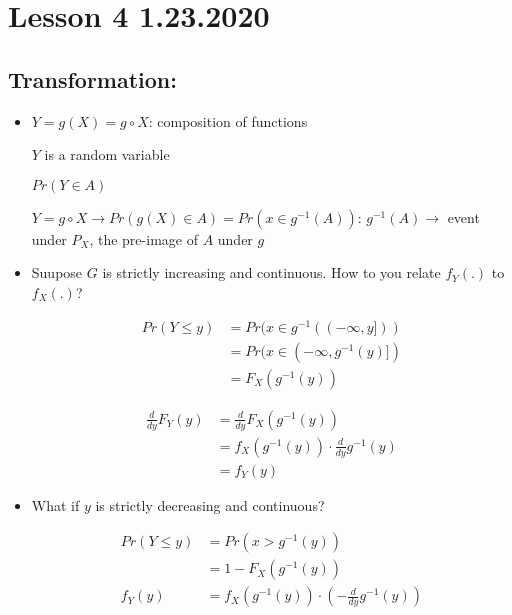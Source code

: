 \documentclass[11pt,letterpaper,titlepage]{article}
\begin{document}
\newpage

\section{Lesson 4 1.23.2020}

\subsection{Transformation:}

\begin{itemize}

    \item $Y = g(X) = g \circ X$: composition of functions
    
    $Y$ is a random variable
    
    $Pr(Y \in A)$
    
    $Y = g \circ X \rightarrow Pr(g(X) \in A) = Pr(x \in g^{-1}(A))$: $g^{-1}(A) \rightarrow$ event under $P_X$, the pre-image of $A$ under $g$
    
    \item Suupose $G$ is strictly increasing and continuous. How to you relate $f_Y(.)$ to $f_X(.)$?
    
    \begin{equation*}
        \begin{aligned}
            Pr(Y \leq y) &= Pr(x \in g^{-1}((-\infty, y])) \\
            &= Pr(x \in (-\infty, g^{-1} (y)]) \\
            &= F_X(g^{-1} (y))
        \end{aligned}
    \end{equation*}
    
    \begin{equation*}
        \begin{aligned}
            \frac{d}{dy} F_Y(y) &= \frac{d}{dy} F_X (g^{-1}(y)) \\
            &= f_X(g^{-1}(y)) \cdot \frac{d}{dy} g^{-1} (y) \\
            &= f_Y(y)
        \end{aligned}
    \end{equation*}
    
    \item What if $y$ is strictly decreasing and continuous?
    
    \begin{equation*}
        \begin{aligned}
            Pr(Y \leq y) &= Pr(x > g^{-1}(y)) \\
            &= 1 - F_X(g^{-1}(y)) \\
            f_Y(y) &= f_X(g^{-1}(y)) \cdot (- \frac{d}{dy} g^{-1}(y))
        \end{aligned}
    \end{equation*}
    

\end{itemize}
\end{document}
